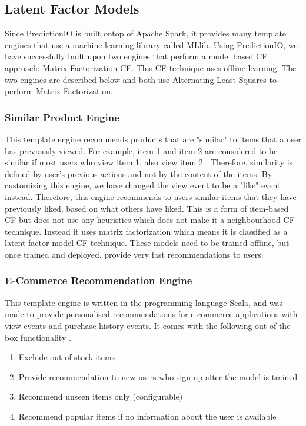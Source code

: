 \subsection{Latent Factor Models}

Since PredictionIO \cite{predictionio} is built ontop of Apache Spark, it provides many template engines that use a machine learning library called MLlib. Using PredictionIO, we have successfully built upon two engines that perform a model based CF approach: Matrix Factorization CF. This CF technique uses offline learning. The two engines are described below and both use Alternating Least Squares to perform Matrix Factorization.  

\subsubsection{Similar Product Engine}

This template engine recommends products that are "similar" to items that a user has previously viewed. For example, item 1 and item 2 are considered to be similar if most users who view item 1, also view item 2 \cite{predictionio}. Therefore, similarity is defined by user's previous actions and not by the content of the items. 
By customizing this engine, we have changed the view event to be a "like" event instead. Therefore, this engine recommends to users similar items that they have previously liked, based on what others have liked. This is a form of item-based CF but does not use any heuristics which does not make it a neighbourhood CF technique. Instead it uses matrix factorization which means it is classified as a latent factor model CF technique. These models need to be trained offline, but once trained and deployed, provide very fast recommendations to users. 

\subsubsection{E-Commerce Recommendation Engine}

This template engine is written in the programming language Scala, and was made to provide personalised recommendations for e-commerce applications with view events and purchase history events. It comes with the following out of the box functionality \cite{predictionio}.
\begin{enumerate}
 \item Exclude out-of-stock items
 \item Provide recommendation to new users who sign up after the model is trained
 \item Recommend unseen items only (configurable)
 \item Recommend popular items if no information about the user is available
\end{enumerate}

